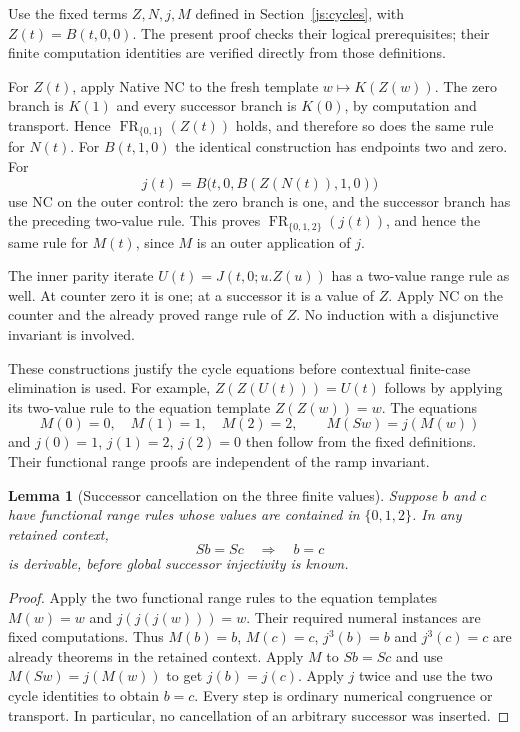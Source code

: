 \documentclass[11pt,letterpaper]{article}
\newtheorem{lemma}[theorem]{Lemma}
\theoremstyle{definition}\newtheorem{definition}[theorem]{Definition}
\theoremstyle{remark}\newtheorem{remark}[theorem]{Remark}
\begin{document}
Use the fixed terms $Z,N,j,M$ defined in
Section~\ref{js:cycles}, with $Z(t)=B(t,0,0)$. The present proof
checks their logical prerequisites; their finite computation identities
are verified directly from those definitions.

For $Z(t)$, apply Native NC to the fresh template $w\mapsto K(Z(w))$.
The zero branch is $K(1)$ and every successor branch is $K(0)$, by
computation and transport.  Hence $\operatorname{FR}_{\{0,1\}}(Z(t))$
holds, and therefore so does the same rule for $N(t)$.
For $B(t,1,0)$ the identical construction has endpoints two and zero.
For
\[
 j(t)=B\bigl(t,0,B(Z(N(t)),1,0)\bigr)
\]
use NC on the outer control: the zero branch is one, and the successor
branch has the preceding two-value rule.  This proves
$\operatorname{FR}_{\{0,1,2\}}(j(t))$, and hence the same rule for
$M(t)$, since $M$ is an outer application of $j$.

The inner parity iterate $U(t)=J(t,0;u.Z(u))$ has a two-value range
rule as well.  At counter zero it is one; at a successor it is a value
of $Z$.  Apply NC on the counter and the already proved range rule of
$Z$.  No induction with a disjunctive invariant is involved.

These constructions justify the cycle equations before contextual
finite-case elimination is used.  For example, $Z(Z(U(t)))=U(t)$ follows
by applying its two-value rule to the equation template $Z(Z(w))=w$.
The equations
\[
 M(0)=0,\quad M(1)=1,\quad M(2)=2,\qquad M(Sw)=j(M(w))
\]
and $j(0)=1$, $j(1)=2$, $j(2)=0$ then follow from the fixed definitions.
Their functional range proofs are independent of the ramp invariant.

\begin{lemma}[Successor cancellation on the three finite values]
\label{nb:finite-cancellation}
Suppose $b$ and $c$ have functional range rules whose values are contained
in $\{0,1,2\}$.  In any retained context,
\[
                         Sb=Sc\quad\Longrightarrow\quad b=c
\]
is derivable, before global successor injectivity is known.
\end{lemma}
\begin{proof}
Apply the two functional range rules to the equation templates
$M(w)=w$ and $j(j(j(w)))=w$.  Their required numeral instances are fixed
computations.  Thus $M(b)=b$, $M(c)=c$, $j^3(b)=b$ and $j^3(c)=c$
are already theorems in the retained context.
Apply $M$ to $Sb=Sc$ and use $M(Sw)=j(M(w))$ to get $j(b)=j(c)$.
Apply $j$ twice and use the two cycle identities to obtain $b=c$.
Every step is ordinary numerical congruence or transport.  In particular,
no cancellation of an arbitrary successor was inserted.
\end{proof}
\end{document}
